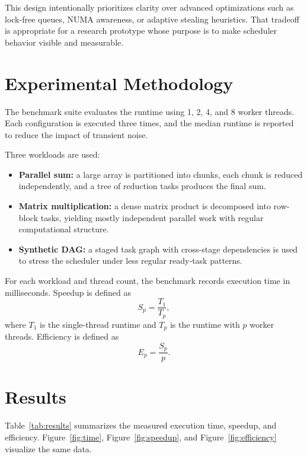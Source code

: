 \documentclass[10pt]{article}
\begin{document}
This design intentionally prioritizes clarity over advanced optimizations such as lock-free queues, NUMA awareness, or adaptive stealing heuristics. That tradeoff is appropriate for a research prototype whose purpose is to make scheduler behavior visible and measurable.

\section{Experimental Methodology}
The benchmark suite evaluates the runtime using 1, 2, 4, and 8 worker threads. Each configuration is executed three times, and the median runtime is reported to reduce the impact of transient noise.

Three workloads are used:
\begin{itemize}
    \item \textbf{Parallel sum:} a large array is partitioned into chunks, each chunk is reduced independently, and a tree of reduction tasks produces the final sum.
    \item \textbf{Matrix multiplication:} a dense matrix product is decomposed into row-block tasks, yielding mostly independent parallel work with regular computational structure.
    \item \textbf{Synthetic DAG:} a staged task graph with cross-stage dependencies is used to stress the scheduler under less regular ready-task patterns.
\end{itemize}

For each workload and thread count, the benchmark records execution time in milliseconds. Speedup is defined as
\[
S_p = \frac{T_1}{T_p},
\]
where $T_1$ is the single-thread runtime and $T_p$ is the runtime with $p$ worker threads. Efficiency is defined as
\[
E_p = \frac{S_p}{p}.
\]

\section{Results}
Table~\ref{tab:results} summarizes the measured execution time, speedup, and efficiency. Figure~\ref{fig:time}, Figure~\ref{fig:speedup}, and Figure~\ref{fig:efficiency} visualize the same data.
\end{document}
